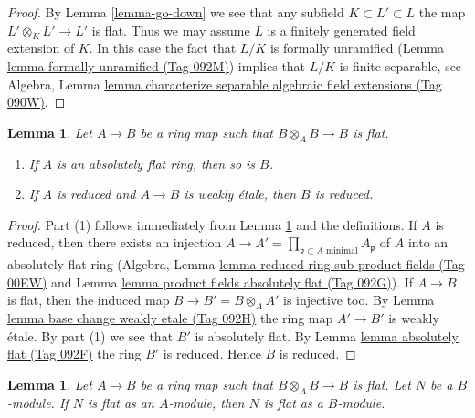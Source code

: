 \documentclass{amsart}
\theoremstyle{plain}
\newtheorem{lemma}[subsection]{Lemma}
\theoremstyle{definition}
\theoremstyle{remark}
\numberwithin{equation}{subsection}
\begin{document}
\begin{proof}
By Lemma \ref{lemma-go-down} we see that any subfield
$K \subset L' \subset L$ the map $L' \otimes_K L' \to L'$ is flat.
Thus we may assume $L$ is a finitely generated field extension of $K$.
In this case the fact that $L/K$ is formally unramified
(Lemma \href{https://stacks.math.columbia.edu/tag/092M}{lemma formally unramified (Tag 092M)})
implies that $L/K$ is finite separable, see Algebra, Lemma
\href{https://stacks.math.columbia.edu/tag/090W}{lemma characterize separable algebraic field extensions (Tag 090W)}.
\end{proof}


\begin{lemma}
\label{lemma-absolutely-flat-over-absolutely-flat}
Let $A \to B$ be a ring map such that $B \otimes_A B \to B$ is flat.
\begin{enumerate}
\item If $A$ is an absolutely flat ring, then so is $B$.
\item If $A$ is reduced and $A \to B$ is weakly \'etale, then $B$ is reduced.
\end{enumerate}
\end{lemma}

\begin{proof}
Part (1) follows immediately from Lemma \ref{lemma-key} and the definitions.
If $A$ is reduced, then there exists an injection
$A \to A' = \prod_{\mathfrak p \subset A\text{ minimal}} A_\mathfrak p$
of $A$ into an absolutely flat ring
(Algebra, Lemma \href{https://stacks.math.columbia.edu/tag/00EW}{lemma reduced ring sub product fields (Tag 00EW)} and
Lemma \href{https://stacks.math.columbia.edu/tag/092G}{lemma product fields absolutely flat (Tag 092G)}).
If $A \to B$ is flat, then the induced map $B \to B' = B \otimes_A A'$
is injective too. By Lemma \href{https://stacks.math.columbia.edu/tag/092H}{lemma base change weakly etale (Tag 092H)}
the ring map $A' \to B'$ is weakly \'etale.
By part (1) we see that $B'$ is absolutely flat.
By Lemma \href{https://stacks.math.columbia.edu/tag/092F}{lemma absolutely flat (Tag 092F)} the ring $B'$ is reduced.
Hence $B$ is reduced.
\end{proof}


\begin{lemma}
\label{lemma-key}
Let $A \to B$ be a ring map such that $B \otimes_A B \to B$ is flat.
Let $N$ be a $B$-module. If $N$ is flat as an $A$-module, then
$N$ is flat as a $B$-module.
\end{lemma}
\end{document}
